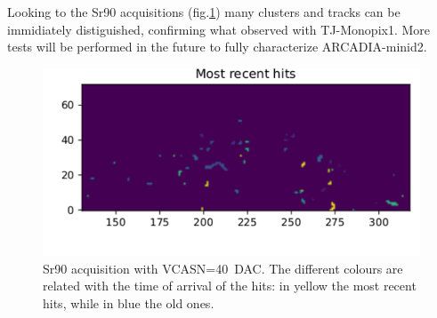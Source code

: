     Looking to the Sr90 acquisitions (fig.\ref{fig:ARCADIA_Sr90}) many clusters and tracks can be immidiately distiguished, confirming what observed with TJ-Monopix1. 
    More tests will be performed in the future to fully characterize ARCADIA-minid2.
    \begin{figure}[h!]
        \centering
        \includegraphics[width=.7\linewidth]{figures/charaterization/ARCADIA/Sr90_2min.pdf}
        \caption{Sr90 acquisition with VCASN=\SI{40}{DAC}. The different colours are related with the time of arrival of the hits: in yellow the most recent hits, while in blue the old ones.}
        \label{fig:ARCADIA_Sr90}
    \end{figure}  
    





